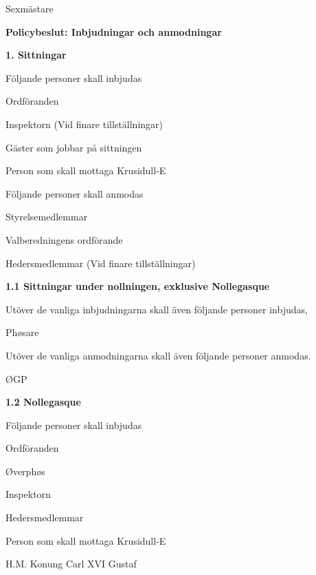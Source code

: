 \documentclass[../_main/handlingar.tex]{subfiles}
\begin{document}
\begin{signatures}{1}
    \ist
    \signature{\sexm}{Sexmästare}
\end{signatures}

\newpage

{\Large \textbf{Policybeslut: Inbjudningar och anmodningar}}

{\large \textbf{1. Sittningar}}

Följande personer skall inbjudas
\begin{dashlist}
    \item Ordföranden
    \item Inspektorn (Vid finare tillställningar) 
    \item Gäster som jobbar på sittningen 
    \item Person som skall mottaga Krusidull-E
    
\end{dashlist}
Följande personer skall anmodas
\begin{dashlist}
    \item Styrelsemedlemmar
    \item Valberedningens ordförande
    \item Hedersmedlemmar (Vid finare tillställningar) 
\end{dashlist}

{\large \textbf{1.1 Sittningar under nollningen, exklusive Nollegasque}}

Utöver de vanliga inbjudningarna skall även följande personer inbjudas, 
\begin{dashlist}
    \item Phøsare
\end{dashlist}
Utöver de vanliga anmodningarna skall även följande personer anmodas. 
\begin{dashlist}
    \item ØGP
\end{dashlist}

{\large \textbf{1.2 Nollegasque}}

Följande personer skall inbjudas
    \begin{dashlist}
        \item Ordföranden
        \item Øverphøs
        \item Inspektorn
        \item Hedersmedlemmar
        \item Person som skall mottaga Krusidull-E
        \item H.M. Konung Carl XVI Gustaf
    \end{dashlist}
\end{document}
